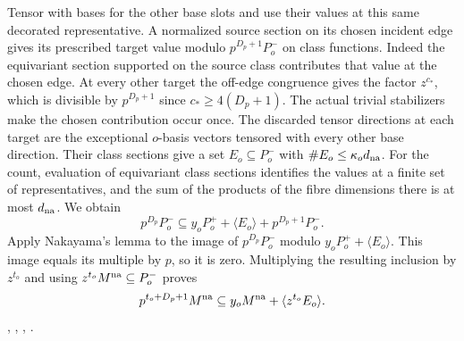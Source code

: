 Tensor with bases for the other base slots and use their values
at this same decorated representative. A normalized source
section on its chosen incident edge gives its prescribed target
value modulo \(p^{D_p+1}P_o^-\) on class functions. Indeed the
equivariant section supported on the source class contributes
that value at the chosen edge. At every other target the
off-edge congruence gives the factor \(z^{c_*}\), which is
divisible by \(p^{D_p+1}\) since \(c_*\ge4(D_p+1)\).
The actual trivial stabilizers make the chosen contribution
occur once. The discarded tensor directions at each target
are the exceptional \(o\)-basis vectors tensored with every
other base direction. Their class sections give a set
\(E_o\subseteq P_o^-\) with \(\#E_o\le\kappa_o d_{\rm na}\).
For the count, evaluation of equivariant class sections identifies
the values at a finite set of representatives, and the sum of the
products of the fibre dimensions there is at most \(d_{\rm na}\).
We obtain
\[
 p^{D_p}P_o^-\subseteq y_o P_o^+ +\langle E_o\rangle
                                     +p^{D_p+1}P_o^- .
\]
Apply Nakayama's lemma to the image of \(p^{D_p}P_o^-\) modulo
\(y_oP_o^++\langle E_o\rangle\). This image equals its multiple
by \(p\), so it is zero. Multiplying the resulting inclusion by
\(z^{t_o}\) and using \(z^{t_o}M^{\rm na}\subseteq P_o^-\) proves
\begin{equation}
\label{eq:classical-donor-one-operator}
 p^{t_o+D_p+1}M^{\rm na}
       \subseteq y_o M^{\rm na}+\langle z^{t_o}E_o\rangle .
\end{equation}
,
,
,
.

